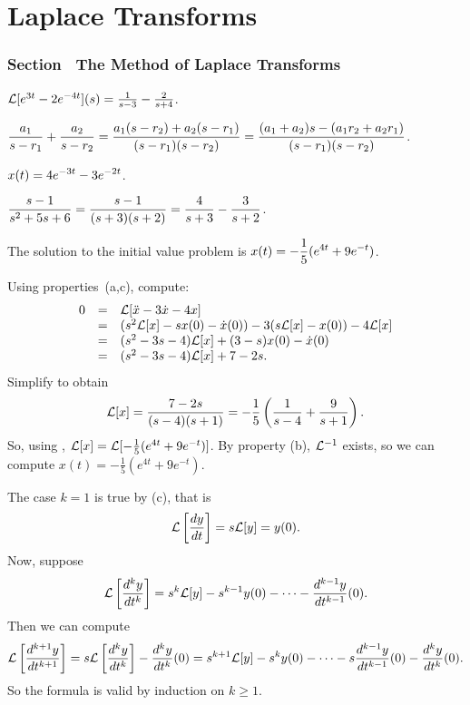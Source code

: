 \chapter{Laplace Transforms}

\subsection*{Section~\protect{\ref{S:13.1}} The Method of Laplace Transforms}

 \ans ${\cal L}[e^{3t}-2e^{-4t}](s) = \frac{1}{s-3} -
\frac{2}{s+4}$.

 $\displaystyle\frac{a_1}{s-r_1} + \frac{a_2}{s-r_2} = 
\frac{a_1(s-r_2)+a_2(s-r_1)}{(s-r_1)(s-r_2)} =
\frac{(a_1+a_2)s - (a_1r_2+a_2r_1)}{(s-r_1)(s-r_2)}$.

 \ans $\displaystyle x(t) = 4e^{-3t}-3e^{-2t}$.

\soln $\displaystyle\frac{s-1}{s^2+5s+6} = \frac{s-1}{(s+3)(s+2)} =
\frac{4}{s+3} - \frac{3}{s+2}$.

 \ans The solution to the initial value problem is
$\displaystyle x(t) = -\frac{1}{5}(e^{4t}+9e^{-t})$.

\soln Using properties~(a,c), compute:
\[
\begin{array}{rcl}
0 & = & {\cal L}[\ddot{x} - 3\dot{x} - 4x] \\
& = & (s^2{\cal L}[x] - sx(0) - \dot{x}(0)) - 3(s{\cal L}[x] - x(0))
- 4{\cal L}[x] \\
& = & (s^2 - 3s - 4){\cal L}[x] + (3 - s)x(0) - \dot{x}(0) \\
& = & (s^2 - 3s - 4){\cal L}[x] + 7 - 2s.
\end{array}
\]
Simplify to obtain
\[
{\cal L}[x] = \frac{7-2s}{(s-4)(s+1)} = 
-\frac{1}{5}\left(\frac{1}{s-4} + \frac{9}{s+1}\right).
\]
So, using ,
${\cal L}[x] = {\cal L}[-\frac{1}{5}(e^{4t}+9e^{-t})]$.  By property 
(b), ${\cal L}^{-1}$ exists, so we can compute 
$x(t) = -\frac{1}{5}(e^{4t}+9e^{-t})$.

 The case $k = 1$ is true by (c), that is
\[
{\cal L}\left[\frac{dy}{dt}\right] = s{\cal L}[y] = y(0).
\]
Now, suppose
\[
{\cal L}\left[\frac{d^ky}{dt^k}\right] = s^k{\cal L}[y] - s^{k - 1}y(0)
- \cdots - \frac{d^{k - 1}y}{dt^{k - 1}}(0).
\]
Then we can compute
\[
{\cal L}\left[\frac{d^{k + 1}y}{dt^{k + 1}}\right] =
s{\cal L}\left[\frac{d^ky}{dt^k}\right] - \frac{d^ky}{dt^k}(0)
= s^{k + 1}{\cal L}[y] - s^{k}y(0)
- \cdots - s\frac{d^{k - 1}y}{dt^{k - 1}}(0) - \frac{d^ky}{dt^k}(0).
\]
So the formula is valid by induction on $k \geq 1$.



